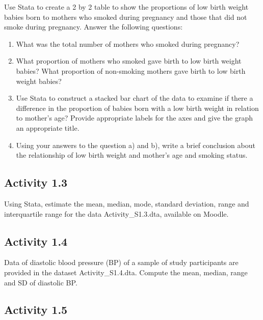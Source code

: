 \documentclass[
]{memoir}
\providecommand{\tightlist}{%
  \setlength{\itemsep}{0pt}\setlength{\parskip}{0pt}}
\begin{document}
Use Stata to create a 2 by 2 table to show the proportions of low birth weight babies born to mothers who smoked during pregnancy and those that did not smoke during pregnancy. Answer the following questions:

\begin{enumerate}
\def\labelenumi{\alph{enumi})}
\tightlist
\item
  What was the total number of mothers who smoked during pregnancy?
\item
  What proportion of mothers who smoked gave birth to low birth weight babies? What proportion of non-smoking mothers gave birth to low birth weight babies?
\item
  Use Stata to construct a stacked bar chart of the data to examine if there a difference in the proportion of babies born with a low birth weight in relation to mother's age? Provide appropriate labels for the axes and give the graph an appropriate title.
\item
  Using your answers to the question a) and b), write a brief conclusion about the relationship of low birth weight and mother's age and smoking status.
\end{enumerate}

\hypertarget{activity-1.3}{%
\subsection*{Activity 1.3}\label{activity-1.3}}

Using Stata, estimate the mean, median, mode, standard deviation, range and interquartile range for the data Activity\_S1.3.dta, available on Moodle.

\hypertarget{activity-1.4}{%
\subsection*{Activity 1.4}\label{activity-1.4}}

Data of diastolic blood pressure (BP) of a sample of study participants are provided in the dataset Activity\_S1.4.dta. Compute the mean, median, range and SD of diastolic BP.

\hypertarget{activity-1.5}{%
\subsection*{Activity 1.5}\label{activity-1.5}}
\end{document}
